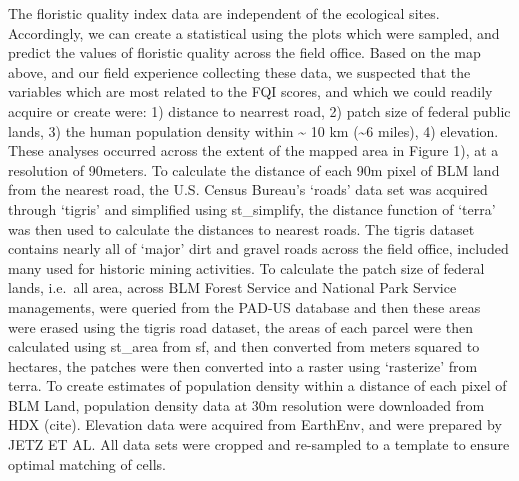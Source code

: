 \documentclass[
]{article}
\begin{document}
The floristic quality index data are independent of the ecological
sites. Accordingly, we can create a statistical using the plots which
were sampled, and predict the values of floristic quality across the
field office. Based on the map above, and our field experience
collecting these data, we suspected that the variables which are most
related to the FQI scores, and which we could readily acquire or create
were: 1) distance to nearrest road, 2) patch size of federal public
lands, 3) the human population density within \textasciitilde{} 10 km
(\textasciitilde6 miles), 4) elevation. These analyses occurred across
the extent of the mapped area in Figure 1), at a resolution of 90meters.
To calculate the distance of each 90m pixel of BLM land from the nearest
road, the U.S. Census Bureau's `roads' data set was acquired through
`tigris' and simplified using st\_simplify, the distance function of
`terra' was then used to calculate the distances to nearest roads. The
tigris dataset contains nearly all of `major' dirt and gravel roads
across the field office, included many used for historic mining
activities. To calculate the patch size of federal lands, i.e.~all area,
across BLM Forest Service and National Park Service managements, were
queried from the PAD-US database and then these areas were erased using
the tigris road dataset, the areas of each parcel were then calculated
using st\_area from sf, and then converted from meters squared to
hectares, the patches were then converted into a raster using
`rasterize' from terra. To create estimates of population density within
a distance of each pixel of BLM Land, population density data at 30m
resolution were downloaded from HDX (cite). Elevation data were acquired
from EarthEnv, and were prepared by JETZ ET AL. All data sets were
cropped and re-sampled to a template to ensure optimal matching of
cells.
\end{document}
